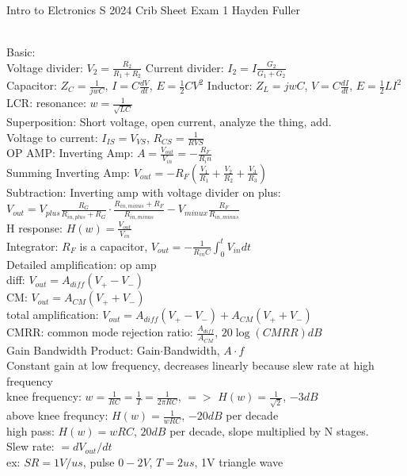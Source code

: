 \documentclass{article}
\begin{document}
Intro to Elctronics S 2024 Crib Sheet Exam 1 Hayden Fuller
\begin{large}
\\Basic:
\\Voltage divider: $V_2=\frac{R_2}{R_1+R_2}$ \hfill Current divider: $I_2=I\frac{G_2}{G_1+G_2}$
\\Capacitor: $Z_C=\frac{1}{jwC}$, $I=C\frac{dV}{dt}$, $E=\frac{1}{2}CV^2$ \hfill Inductor: $Z_L=jwC$, $V=C\frac{dI}{dt}$, $E=\frac{1}{2}LI^2$
\\LCR: resonance: $w=\frac{1}{\sqrt{LC}}$
\\Superposition: Short voltage, open current, analyze the thing, add.
\\Voltage to current: $I_{IS}=V_{VS}$, $R_{CS}=\frac{1}{R{VS}}$
\\OP AMP:      Inverting Amp: $A=\frac{V_{out}}{V_{in}}=-\frac{R_F}{R_in}$
\\Summing Inverting Amp: $V_{out}=-R_F(\frac{V_1}{R_1}+\frac{V_2}{R_2}+\frac{V_3}{R_3})$
\\Subtraction: Inverting amp with voltage divider on plus: $V_{out}=V_{plus}\frac{R_G}{R_{in,plus}+R_G}\cdot\frac{R_{in,minus}+R_F}{R_{in,minus}}-V_{minux}\frac{R_F}{R_{in,minus}}$
\\H response: $H(w)=\frac{V_{out}}{V_{in}}$
\\Integrator: $R_F$ is a capacitor, $V_{out}=-\frac{1}{R_{in}C}\int_0^tV_{in}dt$
\\Detailed amplification: op amp
\\diff: $V_{out}=A_{diff}(V_+-V_-)$
\\CM: $V_{out}=A_{CM}(V_++V_-)$
\\total amplification: $V_{out}=A_{diff}(V_+-V_-)+A_{CM}(V_++V_-)$
\\CMRR: common mode rejection ratio: $\frac{A_{diff}}{A_{CM}}$, $20\log(CMRR)dB$
\\Gain Bandwidth Product: Gain$\cdot$Bandwidth, $A\cdot f$
\\Constant gain at low frequency, decreases linearly because slew rate at high frequency
\\knee frequency: $w=\frac{1}{RC}=\frac{1}{T}=\frac{1}{2\pi RC}$, $=>$ $H(w)=\frac{1}{\sqrt{2}}$, $-3dB$
\\above knee frequncy: $H(w)=\frac{1}{wRC}$, $-20dB$ per decade
\\high pass: $H(w)=wRC$, $20dB$ per decade, slope multiplied by N stages.
\\Slew rate: $=dV_{out}/dt$
\\ex: $SR=1V/us$, pulse $0-2V$, $T=2us$,  1V triangle wave

\end{large}
\end{document}
